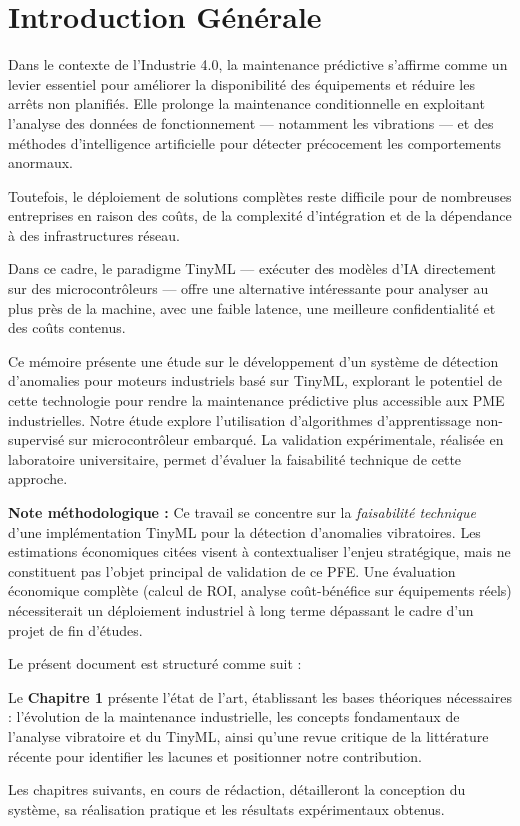 \chapter*{Introduction Générale}
\thispagestyle{plain}  %

Dans le contexte de l'Industrie 4.0, la maintenance prédictive s'affirme comme un levier essentiel pour améliorer la disponibilité des équipements et réduire les arrêts non planifiés. Elle prolonge la maintenance conditionnelle en exploitant l'analyse des données de fonctionnement — notamment les vibrations — et des méthodes d'intelligence artificielle pour détecter précocement les comportements anormaux.

Toutefois, le déploiement de solutions complètes reste difficile pour de nombreuses entreprises en raison des coûts, de la complexité d'intégration et de la dépendance à des infrastructures réseau.

Dans ce cadre, le paradigme TinyML — exécuter des modèles d'IA directement sur des microcontrôleurs — offre une alternative intéressante pour analyser au plus près de la machine, avec une faible latence, une meilleure confidentialité et des coûts contenus.

Ce mémoire présente une étude sur le développement d'un système de détection d'anomalies pour moteurs industriels basé sur TinyML, explorant le potentiel de cette technologie pour rendre la maintenance prédictive plus accessible aux PME industrielles. Notre étude explore l'utilisation d'algorithmes d'apprentissage non-supervisé sur microcontrôleur embarqué. La validation expérimentale, réalisée en laboratoire universitaire, permet d'évaluer la faisabilité technique de cette approche.

\textbf{Note méthodologique :} Ce travail se concentre sur la \textit{faisabilité technique} d'une implémentation TinyML pour la détection d'anomalies vibratoires. Les estimations économiques citées visent à contextualiser l'enjeu stratégique, mais ne constituent pas l'objet principal de validation de ce PFE. Une évaluation économique complète (calcul de ROI, analyse coût-bénéfice sur équipements réels) nécessiterait un déploiement industriel à long terme dépassant le cadre d'un projet de fin d'études.

Le présent document est structuré comme suit :

Le \textbf{Chapitre 1} présente l'état de l'art, établissant les bases théoriques nécessaires : l'évolution de la maintenance industrielle, les concepts fondamentaux de l'analyse vibratoire et du TinyML, ainsi qu'une revue critique de la littérature récente pour identifier les lacunes et positionner notre contribution.

Les chapitres suivants, en cours de rédaction, détailleront la conception du système, sa réalisation pratique et les résultats expérimentaux obtenus.